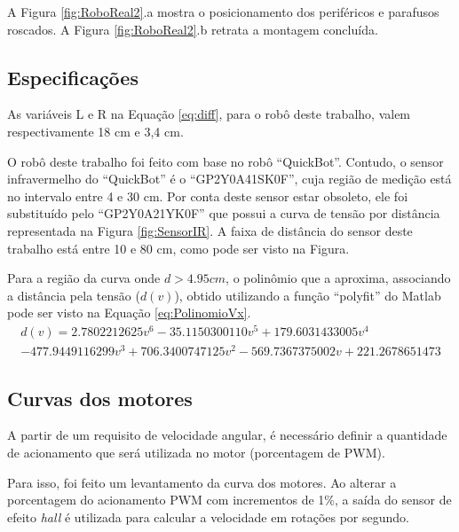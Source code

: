 	A Figura \ref{fig:RoboReal2}.a mostra o posicionamento dos periféricos e parafusos 
	roscados. A Figura \ref{fig:RoboReal2}.b retrata a montagem concluída.
	
	
	
\subsection{Especificações}

As variáveis L e R na Equação \ref{eq:diff}, para o robô deste trabalho, valem
respectivamente 18 cm e 3,4 cm.

O robô deste trabalho foi feito com base no robô ``QuickBot''. Contudo, o sensor infravermelho do ``QuickBot''
é o ``GP2Y0A41SK0F'', cuja região de medição está no intervalo entre 4 e 30 cm. Por conta deste sensor estar 
obsoleto, ele foi substituído pelo ``GP2Y0A21YK0F'' que possui a curva de tensão por distância representada na 
Figura \ref{fig:SensorIR}. A faixa de distância do sensor deste trabalho está entre 10 e 80 cm, como pode ser visto
na Figura. 



Para a região da curva onde $d > 4.95 cm$, o polinômio que a aproxima, associando
a distância pela tensão ($d(v)$), obtido utilizando a função ``polyfit'' do Matlab pode ser visto 
na Equação \ref{eq:PolinomioVx}.
\begin{equation}
	\label{eq:PolinomioVx}
	\begin{split}
		d(v) = 2.7802212625 v^6 -35.1150300110 v^5 + 179.6031433005 v^4 \\
		-477.9449116299 v^3 + 706.3400747125 v^2 -569.7367375002 v + 221.2678651473
	\end{split}
\end{equation}

\subsection{Curvas dos motores}

	A partir de um requisito de velocidade angular, é necessário definir a quantidade de 
	acionamento que será utilizada no motor (porcentagem de PWM).
	
	Para isso, foi feito um levantamento da curva dos motores. Ao alterar a porcentagem do
	acionamento PWM com incrementos de 1\%, a saída do sensor de efeito \textit{hall} é 
	utilizada para calcular a velocidade em rotações por segundo. 
	
